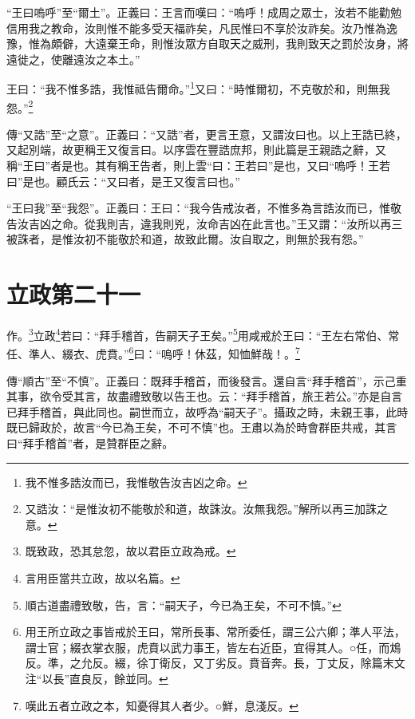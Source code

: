 {\noindent\shu{}\fzkt “王曰嗚呼”至“爾土”。正義曰：王言而嘆曰：“嗚呼！成周之眾士，汝若不能勸勉信用我之教命，汝則惟不能多受天福祚矣，凡民惟曰不享於汝祚矣。汝乃惟為逸豫，惟為頗僻，大遠棄王命，則惟汝眾方自取天之威刑，我則致天之罰於汝身，將遠徙之，使離遠汝之本土。” \par}

王曰：“我不惟多誥，我惟祗告爾命。”\footnote{我不惟多誥汝而已，我惟敬告汝吉凶之命。}又曰：“時惟爾初，不克敬於和，則無我怨。”\footnote{又誥汝：“是惟汝初不能敬於和道，故誅汝。汝無我怨。”解所以再三加誅之意。}


{\noindent\zhuan{}\fzbyks 傳“又誥”至“之意”。正義曰：“又誥”者，更言王意，又謂汝曰也。以上王誥已終，又起別端，故更稱王又復言曰。以序雲在豐誥庶邦，則此篇是王親誥之辭，又稱“王曰”者是也。其有稱王告者，則上雲“曰：王若曰”是也，又曰“嗚呼！王若曰”是也。顧氏云：“又曰者，是王又復言曰也。” \par}

{\noindent\shu{}\fzkt “王曰我”至“我怨”。正義曰：王曰：“我今告戒汝者，不惟多為言誥汝而已，惟敬告汝吉凶之命。從我則吉，違我則兇，汝命吉凶在此言也。”王又謂：“汝所以再三被誅者，是惟汝初不能敬於和道，故致此爾。汝自取之，則無於我有怨。” \par}

\section{立政第二十一}


作。\footnote{既致政，恐其怠忽，故以君臣立政為戒。}立政\footnote{言用臣當共立政，故以名篇。}若曰：“拜手稽首，告嗣天子王矣。”\footnote{順古道盡禮致敬，告，言：“嗣天子，今已為王矣，不可不慎。”}用咸戒於王曰：“王左右常伯、常任、準人、綴衣、虎賁。”\footnote{用王所立政之事皆戒於王曰，常所長事、常所委任，謂三公六卿；準人平法，謂士官；綴衣掌衣服，虎賁以武力事王，皆左右近臣，宜得其人。○任，而鴆反。準，之允反。綴，徐丁衛反，又丁劣反。賁音奔。長，丁丈反，除篇末文注“以長”直良反，餘並同。}曰：“嗚呼！休茲，知恤鮮哉！。\footnote{嘆此五者立政之本，知憂得其人者少。○鮮，息淺反。}


{\noindent\zhuan{}\fzbyks 傳“順古”至“不慎”。正義曰：既拜手稽首，而後發言。還自言“拜手稽首”，示己重其事，欲令受其言，故盡禮致敬以告王也。云：“拜手稽首，旅王若公。”亦是自言已拜手稽首，與此同也。嗣世而立，故呼為“嗣天子”。攝政之時，未親王事，此時既已歸政於，故言“今已為王矣，不可不慎”也。王肅以為於時會群臣共戒，其言曰“拜手稽首”者，是贊群臣之辭。 \par}

